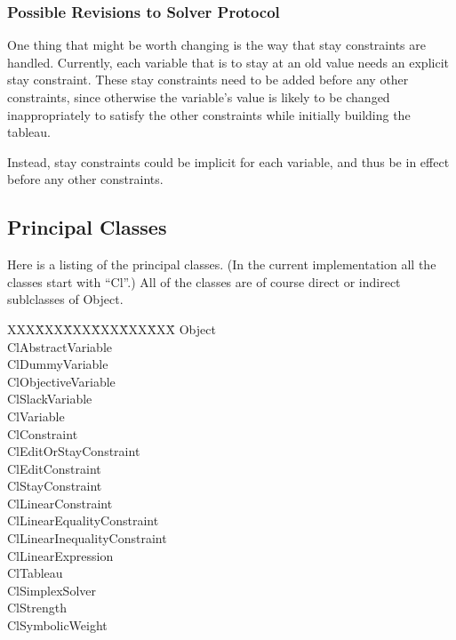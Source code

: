 \documentclass{article}
\begin{document}
\subsubsection{Possible Revisions to Solver Protocol}

One thing that might be worth changing is the way that stay constraints
are handled.  Currently, each variable that is to stay at an old value
needs an explicit stay constraint.  These stay constraints need to be
added before any other constraints, since otherwise the variable's value
is likely to be changed inappropriately to satisfy the other
constraints while initially building the tableau.

Instead, stay constraints could be implicit for each variable, and thus
be in effect before any other constraints.

\subsection{Principal Classes}

Here is a listing of the principal classes.  (In the current implementation
all the classes start with ``{\sf Cl}''.)  All of the classes are of course
direct or indirect sublclasses of {\sf Object}.

\begin{tabbing}
XXX\=XXX\=XXX\=XXX\=XXX\=XXX\=   \kill
\> {\sf Object} \\
\> \> {\sf ClAbstractVariable} \\
\> \> \> {\sf ClDummyVariable} \\
\> \> \> {\sf ClObjectiveVariable} \\
\> \> \> {\sf ClSlackVariable} \\
\> \> \> {\sf ClVariable} \\
\> \> {\sf ClConstraint} \\
\> \> \> {\sf ClEditOrStayConstraint} \\
\> \> \> \> {\sf ClEditConstraint} \\
\> \> \> \> {\sf ClStayConstraint} \\
\> \> \> {\sf ClLinearConstraint} \\
\> \> \> \> {\sf ClLinearEqualityConstraint} \\
\> \> \> \> {\sf ClLinearInequalityConstraint} \\
\> \> {\sf ClLinearExpression} \\
\> \> {\sf ClTableau} \\
\> \> \> {\sf ClSimplexSolver} \\
\> \> {\sf ClStrength} \\
\> \> {\sf ClSymbolicWeight}
\end{tabbing}
\end{document}
